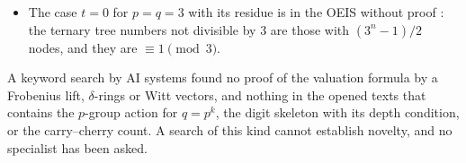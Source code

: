 \documentclass[11pt]{article}
\theoremstyle{definition}
\theoremstyle{remark}
\numberwithin{equation}{section}
\numberwithin{figure}{section}
\begin{document}
\begin{itemize}[itemsep=1pt]
 finite set, the number of points is congruent modulo $p$ to the number of fixed points. As recorded in the
 reference list from slides of Gessel \cite{Gessel}, J.~Petersen proved Fermat's and Wilson's theorems in
 this way in 1872, and Touchard's congruence for the Bell numbers is proved there by letting a $p$-cycle
 act on set partitions, the fixed partitions being those in which the $p$ points form one block (which is
 then collapsed) or $p$ singletons: the same kind of argument as our last step, on set partitions instead of
 trees. Petersen's paper itself was not located.
\item The case $t=0$ for $p=q=3$ with its residue is in the OEIS without proof \cite{OEISA201823}: the ternary
 tree numbers not divisible by $3$ are those with $(3^n-1)/2$ nodes, and they are $\equiv1\pmod 3$.
\end{itemize}
A keyword search by AI systems found no proof of the valuation formula by a Frobenius lift, $\delta$-rings or
Witt vectors, and nothing in the opened texts that contains the $p$-group action for $q=p^k$, the digit
skeleton with its depth condition, or the carry--cherry count. A search of this kind cannot establish novelty,
and no specialist has been asked.
\end{document}
